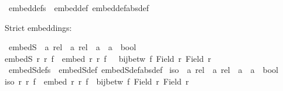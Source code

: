 \begin{isabellebody}
\isanewline
{}\isamarkupfalse%
\ embed{\isacharunderscore}{\kern0pt}defs\ {\isacharequal}{\kern0pt}\ embed{\isacharunderscore}{\kern0pt}def\ embed{\isacharunderscore}{\kern0pt}def{\isacharbrackleft}{\kern0pt}abs{\isacharunderscore}{\kern0pt}def{\isacharbrackright}{\kern0pt}%
\begin{isamarkuptext}%
Strict embeddings:%
\end{isamarkuptext}\isamarkuptrue%
\isamarkupfalse%
\ embedS\ {\isacharcolon}{\kern0pt}{\isacharcolon}{\kern0pt}\ {\isachardoublequoteopen}{\isacharprime}{\kern0pt}a\ rel\ {\isasymRightarrow}\ {\isacharprime}{\kern0pt}a{\isacharprime}{\kern0pt}\ rel\ {\isasymRightarrow}\ {\isacharparenleft}{\kern0pt}{\isacharprime}{\kern0pt}a\ {\isasymRightarrow}\ {\isacharprime}{\kern0pt}a{\isacharprime}{\kern0pt}{\isacharparenright}{\kern0pt}\ {\isasymRightarrow}\ bool{\isachardoublequoteclose}\isanewline
{}\isanewline
{\isachardoublequoteopen}embedS\ r\ r{\isacharprime}{\kern0pt}\ f\ {\isasymequiv}\ embed\ r\ r{\isacharprime}{\kern0pt}\ f\ {\isasymand}\ {\isasymnot}\ bij{\isacharunderscore}{\kern0pt}betw\ f\ {\isacharparenleft}{\kern0pt}Field\ r{\isacharparenright}{\kern0pt}\ {\isacharparenleft}{\kern0pt}Field\ r{\isacharprime}{\kern0pt}{\isacharparenright}{\kern0pt}{\isachardoublequoteclose}\isanewline
\isanewline
{}\isamarkupfalse%
\ embedS{\isacharunderscore}{\kern0pt}defs\ {\isacharequal}{\kern0pt}\ embedS{\isacharunderscore}{\kern0pt}def\ embedS{\isacharunderscore}{\kern0pt}def{\isacharbrackleft}{\kern0pt}abs{\isacharunderscore}{\kern0pt}def{\isacharbrackright}{\kern0pt}\isanewline
\isanewline
{}\isamarkupfalse%
\ iso\ {\isacharcolon}{\kern0pt}{\isacharcolon}{\kern0pt}\ {\isachardoublequoteopen}{\isacharprime}{\kern0pt}a\ rel\ {\isasymRightarrow}\ {\isacharprime}{\kern0pt}a{\isacharprime}{\kern0pt}\ rel\ {\isasymRightarrow}\ {\isacharparenleft}{\kern0pt}{\isacharprime}{\kern0pt}a\ {\isasymRightarrow}\ {\isacharprime}{\kern0pt}a{\isacharprime}{\kern0pt}{\isacharparenright}{\kern0pt}\ {\isasymRightarrow}\ bool{\isachardoublequoteclose}\isanewline
{}\isanewline
{\isachardoublequoteopen}iso\ r\ r{\isacharprime}{\kern0pt}\ f\ {\isasymequiv}\ embed\ r\ r{\isacharprime}{\kern0pt}\ f\ {\isasymand}\ bij{\isacharunderscore}{\kern0pt}betw\ f\ {\isacharparenleft}{\kern0pt}Field\ r{\isacharparenright}{\kern0pt}\ {\isacharparenleft}{\kern0pt}Field\ r{\isacharprime}{\kern0pt}{\isacharparenright}{\kern0pt}{\isachardoublequoteclose}\isanewline
\isanewline
{}\isamarkupfalse%

\end{isabellebody}
